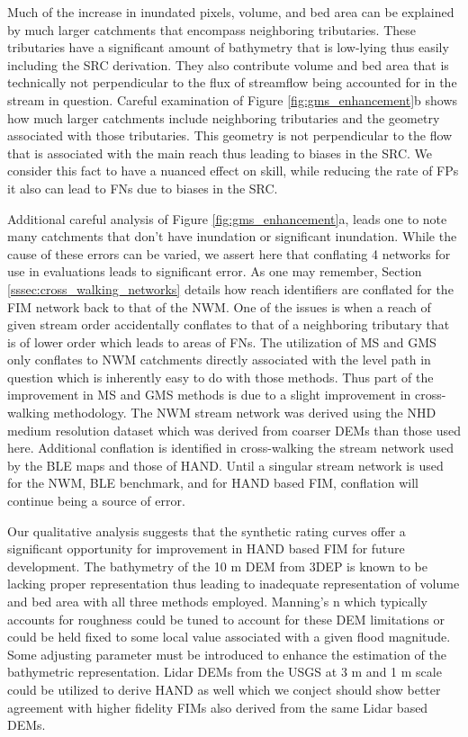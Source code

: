 \documentclass[draft]{dependencies/agujournal2019}
\begin{document}
Much of the increase in inundated pixels, volume, and bed area can be explained by much larger catchments that encompass neighboring tributaries.
These tributaries have a significant amount of bathymetry that is low-lying thus easily including the SRC derivation. 
They also contribute volume and bed area that is technically not perpendicular to the flux of streamflow being accounted for in the stream in question. 
Careful examination of Figure \ref{fig:gms_enhancement}b shows how much larger catchments include neighboring tributaries and the geometry associated with those tributaries. 
This geometry is not perpendicular to the flow that is associated with the main reach thus leading to biases in the SRC.
We consider this fact to have a nuanced effect on skill, while reducing the rate of FPs it also can lead to FNs due to biases in the SRC.

Additional careful analysis of Figure \ref{fig:gms_enhancement}a, leads one to note many catchments that don't have inundation or significant inundation.
While the cause of these errors can be varied, we assert here that conflating 4 networks for use in evaluations leads to significant error.
As one may remember, Section \ref{sssec:cross_walking_networks} details how reach identifiers are conflated for the FIM network back to that of the NWM. 
One of the issues is when a reach of given stream order accidentally conflates to that of a neighboring tributary that is of lower order which leads to areas of FNs.
The utilization of MS and GMS only conflates to NWM catchments directly associated with the level path in question which is inherently easy to do with those methods. 
Thus part of the improvement in MS and GMS methods is due to a slight improvement in cross-walking methodology.
The NWM stream network was derived using the NHD medium resolution dataset which was derived from coarser DEMs than those used here. 
Additional conflation is identified in cross-walking the stream network used by the BLE maps and those of HAND.
Until a singular stream network is used for the NWM, BLE benchmark, and for HAND based FIM, conflation will continue being a source of error.

Our qualitative analysis suggests that the synthetic rating curves offer a significant opportunity for improvement in HAND based FIM for future development.
The bathymetry of the 10 m DEM from 3DEP is known to be lacking proper representation thus leading to inadequate representation of volume and bed area with all three methods employed.
Manning's n which typically accounts for roughness could be tuned to account for these DEM limitations or could be held fixed to some local value associated with a given flood magnitude.
Some adjusting parameter must be introduced to enhance the estimation of the bathymetric representation.
Lidar DEMs from the USGS at 3 m and 1 m scale could be utilized to derive HAND as well which we conject should show better agreement with higher fidelity FIMs also derived from the same Lidar based DEMs.
\end{document}
